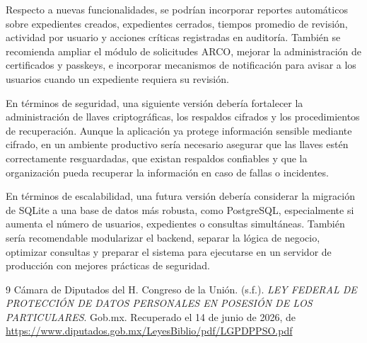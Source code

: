 \documentclass[10pt, letterpaper]{article}
\begin{document}
Respecto a nuevas funcionalidades, se podrían incorporar reportes automáticos sobre expedientes creados, expedientes cerrados, tiempos promedio de revisión, actividad por usuario y acciones críticas registradas en auditoría. También se recomienda ampliar el módulo de solicitudes ARCO, mejorar la administración de certificados y passkeys, e incorporar mecanismos de notificación para avisar a los usuarios cuando un expediente requiera su revisión.

En términos de seguridad, una siguiente versión debería fortalecer la administración de llaves criptográficas, los respaldos cifrados y los procedimientos de recuperación. Aunque la aplicación ya protege información sensible mediante cifrado, en un ambiente productivo sería necesario asegurar que las llaves estén correctamente resguardadas, que existan respaldos confiables y que la organización pueda recuperar la información en caso de fallas o incidentes.

En términos de escalabilidad, una futura versión debería considerar la migración de SQLite a una base de datos más robusta, como PostgreSQL, especialmente si aumenta el número de usuarios, expedientes o consultas simultáneas. También sería recomendable modularizar el backend, separar la lógica de negocio, optimizar consultas y preparar el sistema para ejecutarse en un servidor de producción con mejores prácticas de seguridad.

\begin{thebibliography}{9}
Cámara de Diputados del H. Congreso de la Unión. (s.f.).
\textit{LEY FEDERAL DE PROTECCIÓN DE DATOS PERSONALES EN POSESIÓN DE LOS
PARTICULARES}.
Gob.mx. Recuperado el 14 de junio de 2026, de
\url{https://www.diputados.gob.mx/LeyesBiblio/pdf/LGPDPPSO.pdf}

\end{thebibliography}
\end{document}
